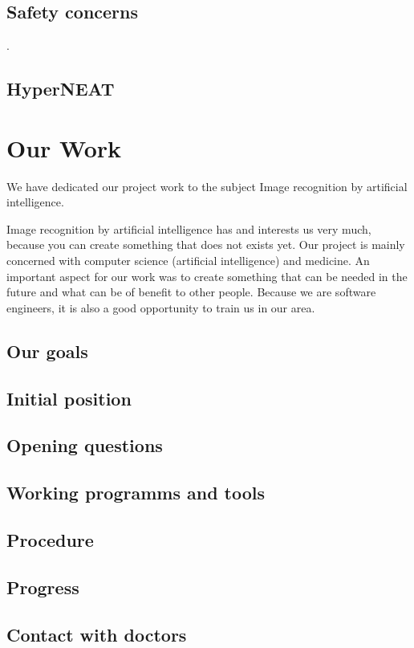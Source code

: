 \documentclass[11pt]{article}
\begin{document}
		\subsection{Safety concerns}
			.
		\subsection{HyperNEAT}
			
	\newpage

	\section{Our Work}
	We have dedicated our project work to the subject Image recognition by artificial intelligence.
	
	Image recognition by artificial intelligence has and interests us very much, because you can create something that does not exists yet. 
	Our project is mainly concerned with computer science (artificial intelligence) and medicine. 
	An important aspect for our work was to create something that can be needed in the future and what can be of benefit to other people. Because we are software engineers, it is also a good opportunity to train us in our area.
	
		
		\subsection{Our goals}
		
		\subsection{Initial position}
		
		\subsection{Opening questions}
		
		\subsection{Working programms and tools}
		
		\subsection{Procedure}
		
		\subsection{Progress}
		
		\subsection{Contact with doctors}
		
	\newpage
	
	\nocite{*}

    \raggedright
    
	
\end{document}
